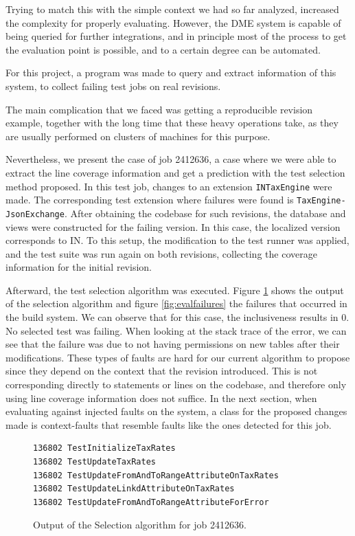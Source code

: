 \documentclass{article}
\begin{document}
Trying to match this with the simple context we had so far analyzed, increased the complexity for properly evaluating. However, the DME system is capable of being queried for further integrations, and in principle most of the process to get the evaluation point is possible, and to a certain degree can be automated.

For this project, a program was made to query and extract information of this system, to collect failing test jobs on real revisions.

The main complication that we faced was getting a reproducible revision example, together with the long time that these heavy operations take, as they are usually performed on clusters of machines for this purpose.

Nevertheless, we present the case of job 2412636, a case where we were able to extract the line coverage information and get a prediction with the test selection method proposed. In this test job, changes to an extension \texttt{INTaxEngine} were made. The corresponding test extension where failures were found is \texttt{TaxEngine-JsonExchange}. After obtaining the codebase for such revisions, the database and views were constructed for the failing version. In this case, the localized version corresponds to IN. To this setup, the modification to the test runner was applied, and the test suite was run again on both revisions, collecting the coverage information for the initial revision.

Afterward, the test selection algorithm was executed. Figure \ref{fig:evalalgout} shows the output of the selection algorithm and figure \ref{fig:evalfailures} the failures that occurred in the build system. We can observe that for this case, the inclusiveness results in 0. No selected test was failing. When looking at the stack trace of the error, we can see that the failure was due to not having permissions on new tables after their modifications. These types of faults are hard for our current algorithm to propose since they depend on the context that the revision introduced. This is not corresponding directly to statements or lines on the codebase, and therefore only using line coverage information does not suffice. In the next section, when evaluating against injected faults on the system, a class for the proposed changes made is context-faults that resemble faults like the ones detected for this job.


\begin{figure}[H]
\begin{verbatim}
136802 TestInitializeTaxRates
136802 TestUpdateTaxRates
136802 TestUpdateFromAndToRangeAttributeOnTaxRates
136802 TestUpdateLinkdAttributeOnTaxRates
136802 TestUpdateFromAndToRangeAttributeForError 
\end{verbatim}
\caption{Output of the Selection algorithm for job 2412636.}
\label{fig:evalalgout}
\end{figure}
\end{document}

